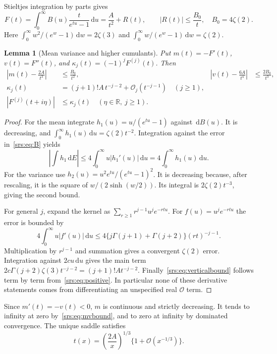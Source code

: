\documentclass[11pt]{article}
\numberwithin{equation}{section}
\newtheorem{lemma}[theorem]{Lemma}
\theoremstyle{remark}\newtheorem{remark}[theorem]{Remark}
\newcommand{\Oh}{\mathcal O}
\newcommand{\dd}{\,\mathrm d}
\newcommand{\R}{\mathbb R}
\begin{document}
Stieltjes integration by parts gives
\begin{equation}
 F(t)=\int_0^\infty B(u)\frac{t}{e^{tu}-1}\dd u
     =\frac A{t^2}+R(t),\qquad |R(t)|\le\frac{B_0}{t},
 \quad B_0=4\zeta(2).\label{srs:eq:Fbound}
\end{equation}
Here $\int_0^\infty w^2/(e^w-1)\dd w=2\zeta(3)$ and
$\int_0^\infty w/(e^w-1)\dd w=\zeta(2)$.

\begin{lemma}[Mean variance and higher cumulants]\label{srs:lem:cumulants}
Put $m(t)=-F'(t)$, $v(t)=F''(t)$, and $\kappa_j(t)=(-1)^jF^{(j)}(t)$. Then
\begin{align}
 \left|m(t)-\frac{2A}{t^3}\right|&\le\frac{B_0}{t^2},&
 \left|v(t)-\frac{6A}{t^4}\right|&\le\frac{2B_0}{t^3},\label{srs:eq:mvbound}\\
 \kappa_j(t)&=(j+1)!A\,t^{-j-2}+\Oh_j(t^{-j-1})\quad(j\ge1),\label{srs:eq:cumulants}\\
 |F^{(j)}(t+i\eta)|&\le\kappa_j(t)\quad(\eta\in\R,\ j\ge1).
 \label{srs:eq:verticalbound}
\end{align}
\end{lemma}
\begin{proof}
For the mean integrate $h_1(u)=u/(e^{tu}-1)$ against $\dd B(u)$. It is decreasing, and $\int_0^\infty h_1(u)\dd u=\zeta(2)t^{-2}$. Integration against the error in~\eqref{srs:eq:B} yields
\[
 \left|\int h_1\dd E\right|\le4\int_0^\infty u|h_1'(u)|\dd u
 =4\int_0^\infty h_1(u)\dd u.
\]
For the variance use $h_2(u)=u^2e^{tu}/(e^{tu}-1)^2$. It is decreasing because, after rescaling, it is the square of $w/(2\sinh(w/2))$. Its integral is $2\zeta(2)t^{-3}$, giving the second bound.

For general $j$, expand the kernel as $\sum_{r\ge1}r^{j-1}u^je^{-rtu}$. For $f(u)=u^je^{-rtu}$ the error is bounded by
\begin{equation}
 4\int_0^\infty u|f'(u)|\dd u
 \le 4\{j\Gamma(j+1)+\Gamma(j+2)\}(rt)^{-j-1}.
 \label{srs:eq:cumerror}
\end{equation}
Multiplication by $r^{j-1}$ and summation gives a convergent $\zeta(2)$ error. Integration against $2cu\dd u$ gives the main term
$2c\Gamma(j+2)\zeta(3)t^{-j-2}=(j+1)!At^{-j-2}$.
Finally~\eqref{srs:eq:verticalbound} follows term by term from~\eqref{srs:eq:positive}.
In particular none of these derivative statements comes from differentiating an unspecified real $\Oh$ term.
\end{proof}

Since $m'(t)=-v(t)<0$, $m$ is continuous and strictly decreasing. It tends to infinity at zero by~\eqref{srs:eq:mvbound}, and to zero at infinity by dominated convergence. The unique saddle satisfies
\begin{equation}
 t(x)=\left(\frac{2A}x\right)^{1/3}\{1+\Oh(x^{-1/3})\}.
 \label{srs:eq:tsaddle}
\end{equation}
\end{document}
